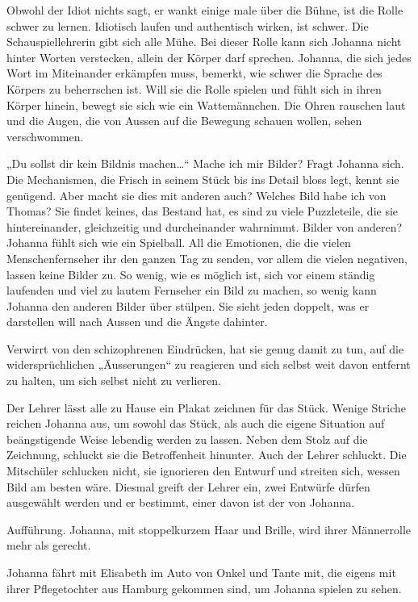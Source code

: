 \documentclass[10pt,titlepage,a5paper]{book}
\begin{document}
Obwohl der Idiot nichts sagt, er wankt einige male über die Bühne, ist die Rolle schwer zu lernen. Idiotisch laufen und authentisch wirken, ist schwer. Die Schauspiellehrerin gibt sich alle Mühe. Bei dieser Rolle kann sich Johanna nicht hinter Worten verstecken, allein der Körper darf sprechen. Johanna, die sich jedes Wort im Miteinander erkämpfen muss, bemerkt, wie schwer die Sprache des Körpers zu beherrschen ist. Will sie die Rolle spielen und fühlt sich in ihren Körper hinein, bewegt sie sich wie ein Wattemännchen. Die Ohren rauschen laut und die Augen, die von Aussen auf die Bewegung schauen wollen, sehen verschwommen. 


„Du sollst dir kein Bildnis machen\dots “ Mache ich mir Bilder? Fragt Johanna sich. Die Mechanismen, die Frisch in seinem Stück bis ins Detail bloss legt, kennt sie genügend. Aber macht sie dies mit anderen auch? Welches Bild habe ich von Thomas? Sie findet keines, das Bestand hat, es sind zu viele Puzzleteile, die sie hintereinander, gleichzeitig und durcheinander wahrnimmt. Bilder von anderen? Johanna fühlt sich wie ein Spielball. All die Emotionen, die die vielen Menschenfernseher ihr den ganzen Tag zu senden, vor allem die vielen negativen, lassen keine Bilder zu. So wenig, wie es möglich ist, sich vor einem ständig laufenden und viel zu lautem Fernseher ein Bild zu machen, so wenig kann Johanna den anderen Bilder über stülpen. Sie sieht jeden doppelt, was er darstellen will nach Aussen und die Ängste dahinter. 

Verwirrt von den schizophrenen Eindrücken, hat sie genug damit zu tun, auf die widersprüchlichen „Äusserungen“ zu reagieren und sich selbst weit davon entfernt zu halten, um sich selbst nicht zu verlieren.

Der Lehrer lässt alle zu Hause ein Plakat zeichnen für das Stück. Wenige Striche reichen Johanna aus, um sowohl das Stück, als auch die eigene Situation auf beängstigende Weise lebendig werden zu lassen. Neben dem Stolz auf die Zeichnung, schluckt sie die Betroffenheit hinunter. Auch der Lehrer schluckt. Die Mitschüler schlucken nicht, sie ignorieren den Entwurf und streiten sich, wessen Bild am besten wäre. Diesmal greift der Lehrer ein, zwei Entwürfe dürfen ausgewählt werden und er bestimmt, einer davon ist der von Johanna.

Aufführung. Johanna, mit stoppelkurzem Haar und Brille, wird ihrer Männerrolle mehr als gerecht. 

Johanna fährt mit Elisabeth im Auto von Onkel und Tante mit, die eigens mit ihrer Pflegetochter aus Hamburg gekommen sind, um Johanna spielen zu sehen. 
\end{document}
